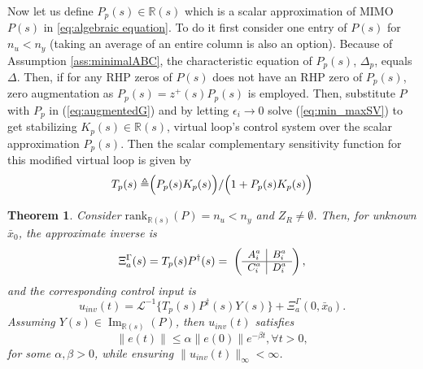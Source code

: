 \documentclass[journal]{IEEEtran}
\newtheorem{theorem}{Theorem}
\theoremstyle{remark}
\DeclareMathOperator*{\im}{Im}
\begin{document}
Now let us define $P_p(s) \in \mathbb{R}(s)$ which is a scalar approximation of MIMO $P(s)$ in \eqref{eq:algebraic equation}. To do it first consider one entry of $P(s)$ for $n_u<n_y$ (taking an average of an entire column is also an option). Because of Assumption \ref{ass:minimalABC}, the characteristic equation of $P_p(s)$, $\Delta_p$, equals $\Delta$. Then, if for any RHP zeros of $P(s)$ does not have an RHP zero of $P_p(s)$, zero augmentation as $P_p(s)=z^+(s)P_p(s)$ is employed. Then, substitute $P$ with $P_p$ in (\ref{eq:augmentedG}) and by letting $\epsilon_i \to 0$ solve (\ref{eq:min_maxSV}) to get stabilizing $K_p(s) \in \mathbb{R}(s)$, virtual loop's control system  over the scalar approximation $P_p(s)$. Then the scalar complementary sensitivity function for this modified virtual loop is given by 
\begin{align}\label{eqTp}
T_p(s) \triangleq \Bigr( P_p(s)K_p(s)\Bigl)/\Bigr( 1+P_p(s)K_p(s)\Bigl)
\end{align}
\begin{theorem}\label{th:nm_phase_pseudoinverses}
Consider \(\text{rank}_{\mathbb{R}(s)}(P) = n_u < n_y\) and \( Z_R \neq \emptyset \). Then, for unknown $\bar{x}_0$, the approximate inverse is 
\begin{equation} \label{eq:almostpinverse}
  \Xi_a^\Gamma(s) = T_p(s)P^{\dagger}(s)=\;
\small \left(\begin{array}{c|c}
   A_i^a & B_i^a \\ \hline
   C_i^a & D_i^a
\end{array}\right)\normalsize,
\end{equation}
and the corresponding control input is
\begin{equation} \label{eq:almostinverse_ns_time}
  u_{inv}(t) = \mathscr{L}^{-1}\{T_p(s)P^{\dagger}(s)Y(s) \}+ \Xi_a^\Gamma(0,\bar{x}_0).
\end{equation}
Assuming $Y(s) \in \im_{\mathbb{R}(s)}(P)$, then $u_{inv}(t)$ satisfies
\begin{equation} \label{exp_decay_nmppseudo}
    \|e(t)\| \leq \alpha \|e(0)\| e^{-\beta t}, \forall t > 0,
\end{equation}
for some $\alpha,\beta>0$, while ensuring $\|u_{inv}(t)\|_\infty<\infty$. 
\end{theorem} 
\end{document}

